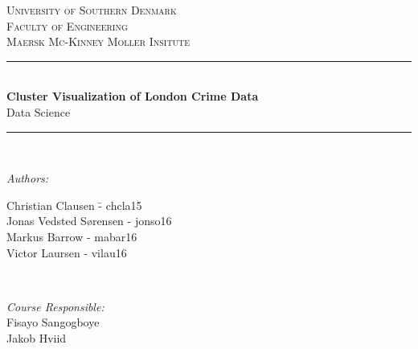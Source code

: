 \begin{titlepage}
\newcommand{\HRule}{\rule{\linewidth}{0.5mm}} %

\center %
 

\textsc{\LARGE University of Southern Denmark}\\[1.5cm] 
\textsc{\Large Faculty of Engineering}\\[0.5cm]
\textsc{\large Maersk Mc-Kinney Moller Insitute}\\[0.5cm] 


\HRule \\[0.4cm]
{ \Huge \bfseries Cluster Visualization of London Crime Data}\\[0.4cm]
{\huge  Data Science}
\HRule \\[1.5cm]
 



\begin{minipage}{0.4\textwidth}
    \begin{flushleft} \large
        \emph{Authors:}\\
        \begin{tabbing}
        
        Christian Clausen \hphantom{zzzzzzzzz} \=- chcla15\\
        Jonas Vedsted Sørensen \>- jonso16\\
        Markus Barrow \>- mabar16\\
        Victor Laursen \>- vilau16\\

        \end{tabbing}
        
    \end{flushleft}
\end{minipage}~
\begin{minipage}{0.4\textwidth}
    \begin{flushright} \large
        \emph{Course Responsible:} \\
        Fisayo Sangogboye \\
        Jakob Hviid
    \end{flushright}
\end{minipage}\\[2cm]


\end{titlepage}
